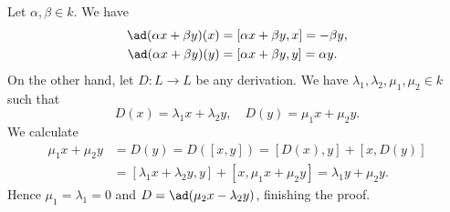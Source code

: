 Let $\alpha, \beta \in k$. We have
\begin{align*}
	\ad(\alpha x + \beta y)(x) &= [\alpha x + \beta y, x] = -\beta y,\\
	\ad(\alpha x + \beta y)(y) &= [\alpha x + \beta y, y] = \alpha y.\\
\end{align*}
On the other hand, let $D\colon L\to L$ be any derivation.
We have $\lambda_1, \lambda_2, \mu_1, \mu_2 \in k$ such that
\[ D(x) = \lambda_1 x + \lambda_2 y,\quad D(y) = \mu_1 x + \mu_2 y. \]
We calculate
\begin{align*}
	\mu_1 x + \mu_2 y &= D(y) = D([x, y]) = [D(x), y] + [x, D(y)]\\
	&= [\lambda_1 x + \lambda_2 y, y] + [x, \mu_1 x + \mu_2 y] = \lambda_1 y + \mu_2 y.
\end{align*}
Hence $\mu_1 = \lambda_1 = 0$ and $D = \ad(\mu_2 x - \lambda_2 y)$, finishing
the proof.
